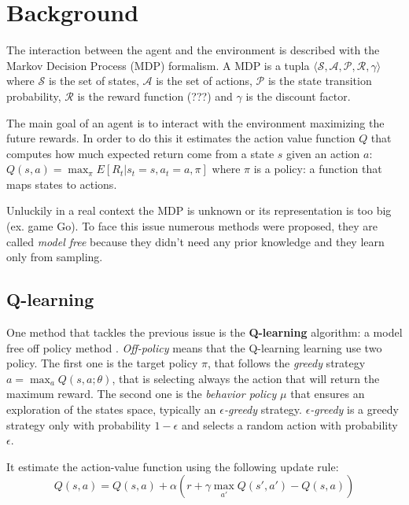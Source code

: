 \section{Background}


The interaction between the agent and the environment is described  with the
Markov Decision Process (MDP) formalism. A MDP is a tupla $\langle \mathcal{S}, 
\mathcal{A}, \mathcal{P}, \mathcal{R}, \gamma \rangle$ where $\mathcal{S}$ is
the set of states, $\mathcal{A}$ is the set of actions, $\mathcal{P}$ is the 
state transition probability, $\mathcal{R}$ is the reward function (???) and 
$\gamma$ is the discount factor.

The main goal of an agent is to interact with the environment maximizing the future rewards. In order to do this it estimates the action value function $Q$ that computes how much expected return come from a state $s$ given an action $a$: $Q(s, a) = \max_\pi E[R_t | s_t = s, a_t = a, \pi]$ where $\pi$ is a policy: a function that maps states to actions.


Unluckily in a real context the MDP is unknown or its representation is too big
(ex. game Go). To face this issue numerous methods were proposed, they are 
called \textit{model free} because they didn't need any prior knowledge and they learn only from sampling.


\subsection{Q-learning}

One method that tackles the previous issue is the \textbf{Q-learning} algorithm: a model free off policy method \cite{Watkins1992}. 
\textit{Off-policy} means that the Q-learning learning use two policy. The first one is the target policy $\pi$, that follows the \textit{greedy} strategy $a = \max_a Q(s, a; \theta)$, that is selecting always the action that will return the maximum reward.
The second one is the \textit{behavior policy} $\mu$ that ensures an exploration of the states space, typically an \textit{$\epsilon$-greedy} strategy. \textit{$\epsilon$-greedy} is a greedy strategy only with probability $1 - \epsilon$ and selects a random action with probability $\epsilon$.

It estimate the action-value function using the following update rule:
\begin{equation}
	Q(s,a) = Q(s, a) + \alpha (r + \gamma \max_{a'} Q(s', a') - Q(s, a))
\end{equation}


